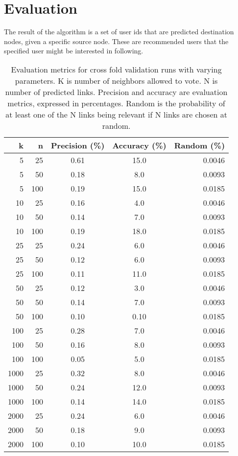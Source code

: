 
\chapter{Evaluation}

The result of the algorithm is a set of user ids that are predicted destination nodes, given a specific source node. These are recommended users that the specified user might be interested in following. 
\begin{table}[t]
\caption{Evaluation metrics for cross fold validation runs with varying parameters. K is number of neighbors allowed to vote. N is number of predicted links. Precision and accuracy are evaluation metrics, expressed in percentages. Random is the probability of at least one of the N links being relevant if N links are chosen at random.}
\label{results}
\vskip 0.15in
\begin{center}
\begin{small}
\begin{sc}
\begin{tabular}{rrccr}
\hline
k & n & Precision (\%) & Accuracy (\%) & Random (\%) \\
\hline
5      & 25 & 0.61 & 15.0 & 0.0046\\
5      & 50 & 0.18 & 8.0 & 0.0093 \\
5      & 100&0.19 & 15.0 & 0.0185\\
10    & 25 & 0.16& 4.0 & 0.0046\\
10    & 50 & 0.14 & 7.0 & 0.0093\\
10    & 100&0.19 & 18.0 & 0.0185 \\
25    & 25 & 0.24 & 6.0  & 0.0046\\
25    & 50 & 0.12 & 6.0  & 0.0093\\
25    &100&0.11 & 11.0  & 0.0185\\  
50    & 25 &0.12 & 3.0 & 0.0046\\
50    & 50 & 0.14 & 7.0  & 0.0093\\
50    &100& 0.10 & 0.10  & 0.0185\\
100 & 25 & 0.28 & 7.0  & 0.0046\\
100 & 50 & 0.16 & 8.0  & 0.0093\\
100 &100& 0.05 & 5.0  & 0.0185\\
1000&25&0.32 & 8.0  & 0.0046\\
1000&50&0.24& 12.0  & 0.0093\\
1000&100&0.14&14.0  & 0.0185\\
2000&25&0.24&6.0 & 0.0046\\
2000&50&0.18&9.0 & 0.0093\\
2000&100&0.10&10.0  & 0.0185\\
\hline
\end{tabular}
\end{sc}
\end{small}
\end{center}
\vskip -0.1in
\end{table}

